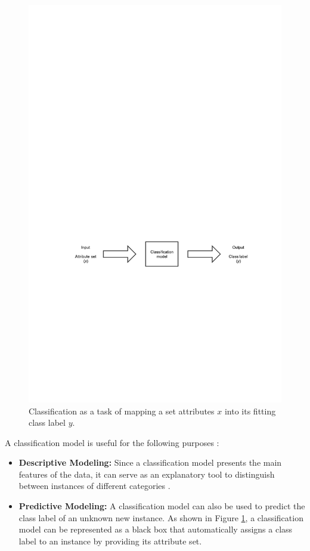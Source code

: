 \begin{figure}[!htp]
  \center
  \includegraphics[width=\textwidth]{figures/classification}
  \caption{Classification as a task of mapping a set attributes $x$ into its fitting class label $y$.}
  \label{fig:classification_task}
\end{figure}

A classification model is useful for the following purposes \cite{pang2006introduction}:

\begin{itemize}
\item \textbf{Descriptive Modeling:} Since a classification model presents the main features of the data, it can serve as an explanatory tool to distinguish between instances of different categories \cite{madigan2002descriptive}.

\item \textbf{Predictive Modeling:} A classification model can also be used to predict the class label of an unknown new instance. As shown in Figure \ref{fig:classification_task}, a classification model can be represented as a black box that automatically assigns a class label to an instance by providing its attribute set.
\end{itemize}

